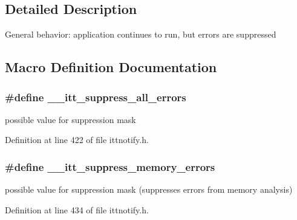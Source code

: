 \subsection{Detailed Description}
General behavior\-: application continues to run, but errors are suppressed 

\subsection{Macro Definition Documentation}
\hypertarget{group__suppress_ga3900b5fa67bc34ea6d9cd9f13626c7a8}{
\subsubsection[{\-\_\-\-\_\-itt\-\_\-suppress\-\_\-all\-\_\-errors}]{\setlength{\rightskip}{0pt plus 5cm}\#define \-\_\-\-\_\-itt\-\_\-suppress\-\_\-all\-\_\-errors}}\label{group__suppress_ga3900b5fa67bc34ea6d9cd9f13626c7a8}


possible value for suppression mask 



Definition at line 422 of file ittnotify.\-h.

\hypertarget{group__suppress_gacb8880266f3c9716e202a9a6b1e0fa63}{
\subsubsection[{\-\_\-\-\_\-itt\-\_\-suppress\-\_\-memory\-\_\-errors}]{\setlength{\rightskip}{0pt plus 5cm}\#define \-\_\-\-\_\-itt\-\_\-suppress\-\_\-memory\-\_\-errors}}\label{group__suppress_gacb8880266f3c9716e202a9a6b1e0fa63}


possible value for suppression mask (suppresses errors from memory analysis) 



Definition at line 434 of file ittnotify.\-h.

